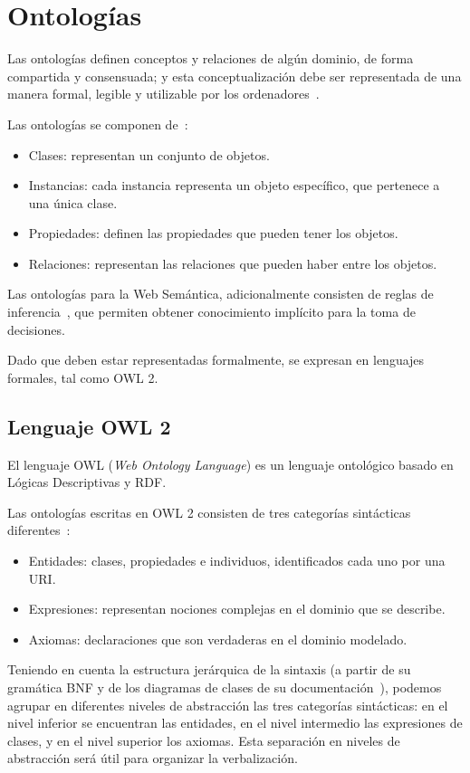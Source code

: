 \section{Ontologías}
Las ontologías definen conceptos y relaciones de algún dominio, de forma compartida y consensuada; y  esta conceptualización debe ser representada de una manera formal, legible y utilizable por los ordenadores~\cite{tello2001ontologias}. 

Las ontologías se componen de~\cite{llop2007especificacion}:
\begin{itemize}
    \item Clases: representan un conjunto de objetos.
    \item Instancias: cada instancia representa un objeto específico, que pertenece a una única clase.
    \item Propiedades: definen las propiedades que pueden tener los objetos.
    \item Relaciones: representan las relaciones que pueden haber entre los objetos.
\end{itemize}
Las ontologías para la Web Semántica, adicionalmente consisten  de reglas de inferencia~\cite{SWBernersLee}, que permiten obtener conocimiento implícito para la toma de decisiones.

Dado que deben estar representadas formalmente, se expresan en lenguajes formales, tal como OWL 2.

\subsection{Lenguaje OWL 2}
El lenguaje OWL (\emph{Web Ontology Language}) es un lenguaje ontológico basado en Lógicas Descriptivas y RDF. 

Las ontologías escritas en OWL 2 consisten de tres categorías sintácticas diferentes~\cite{OWL2W3C}:
\begin{itemize}
    \item Entidades: clases, propiedades e individuos, identificados cada uno por una URI.
    \item Expresiones: representan nociones complejas en el dominio que se describe.
    \item Axiomas: declaraciones que son verdaderas en el dominio modelado.
\end{itemize}

Teniendo en cuenta la estructura jerárquica de la sintaxis (a partir de su gramática BNF y de los diagramas de clases de su documentación~\cite{OWL2W3C}), podemos agrupar en diferentes niveles de abstracción las tres categorías sintácticas: en el nivel inferior se encuentran las entidades, en el nivel intermedio las expresiones de clases, y en el nivel superior los axiomas. Esta separación en niveles de abstracción será útil para organizar la verbalización.

